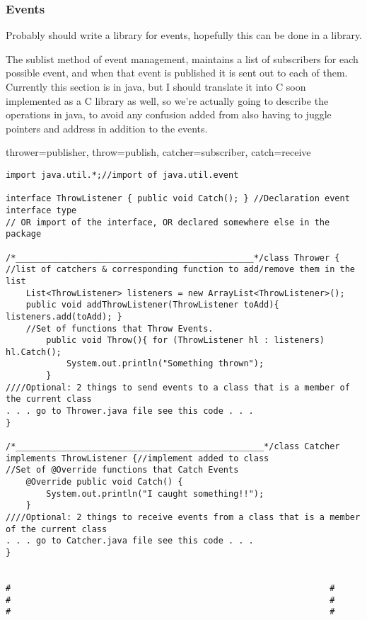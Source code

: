 \hypertarget{events}{%
\subsubsection{Events}\label{events}}

Probably should write a library for events, hopefully this can be done
in a library.

The sublist method of event management, maintains a list of subscribers
for each possible event, and when that event is published it is sent out
to each of them. Currently this section is in java, but I should
translate it into C soon implemented as a C library as well, so we're
actually going to describe the operations in java, to avoid any
confusion added from also having to juggle pointers and address in
addition to the events.

thrower=publisher, throw=publish, catcher=subscriber, catch=receive

\begin{verbatim}
import java.util.*;//import of java.util.event

interface ThrowListener { public void Catch(); } //Declaration event interface type
// OR import of the interface, OR declared somewhere else in the package

/*_______________________________________________*/class Thrower {
//list of catchers & corresponding function to add/remove them in the list
    List<ThrowListener> listeners = new ArrayList<ThrowListener>();
    public void addThrowListener(ThrowListener toAdd){ listeners.add(toAdd); }
    //Set of functions that Throw Events.
        public void Throw(){ for (ThrowListener hl : listeners) hl.Catch();
            System.out.println("Something thrown");
        }
////Optional: 2 things to send events to a class that is a member of the current class
. . . go to Thrower.java file see this code . . .
}

/*_________________________________________________*/class Catcher
implements ThrowListener {//implement added to class
//Set of @Override functions that Catch Events
    @Override public void Catch() {
        System.out.println("I caught something!!");
    }
////Optional: 2 things to receive events from a class that is a member of the current class
. . . go to Catcher.java file see this code . . .
}


#                                                               #
#                                                               #
#                                                               #
\end{verbatim}

